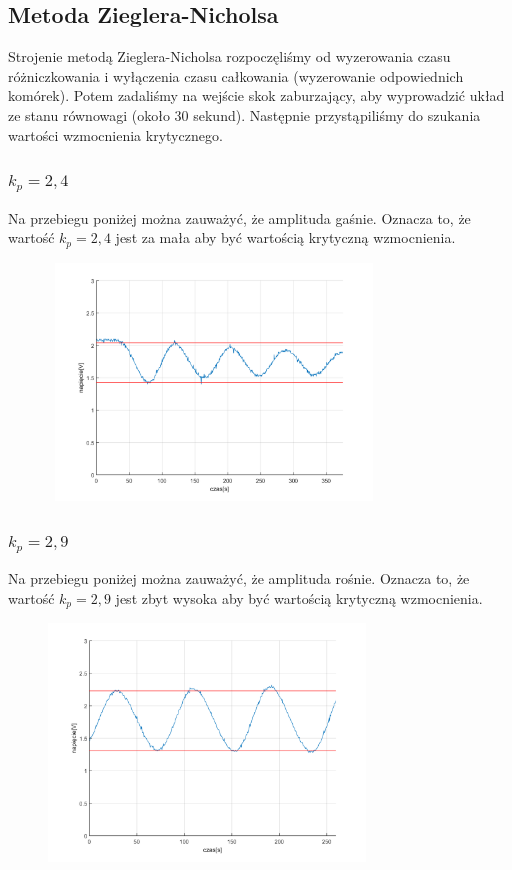 \documentclass[a4paper, 12pt]{article}
\begin{document}
		\subsection{Metoda Zieglera-Nicholsa}
			Strojenie metodą Zieglera-Nicholsa rozpoczęliśmy od wyzerowania czasu różniczkowania i wyłączenia czasu całkowania (wyzerowanie odpowiednich komórek). Potem zadaliśmy na wejście skok zaburzający, aby wyprowadzić układ ze stanu równowagi (około 30 sekund). Następnie przystąpiliśmy do szukania wartości wzmocnienia krytycznego.
			\subsubsection{$k_p = 2,4$}
				Na przebiegu poniżej można zauważyć, że amplituda gaśnie. Oznacza to, że wartość $k_p = 2,4$ jest za mała aby być wartością krytyczną wzmocnienia.
				\begin{figure}[H]
					\centering\
					\includegraphics[width=0.75\textwidth]{./img/too_low.png}
				\end{figure}
			\subsubsection{$k_p = 2,9$}
				Na przebiegu poniżej można zauważyć, że amplituda rośnie. Oznacza to, że wartość $k_p = 2,9$ jest zbyt wysoka aby być wartością krytyczną wzmocnienia.
				\begin{figure}[H]
					\centering
					\includegraphics[width=0.75\textwidth]{./img/too_high.png}
				\end{figure}
			\newpage
\end{document}

